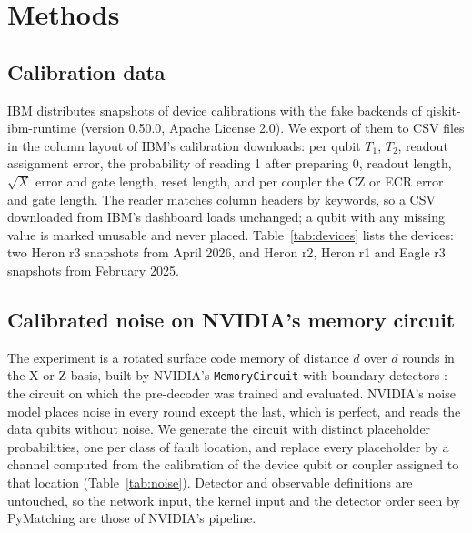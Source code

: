 \section{Methods}\label{sec:methods}

\subsection{Calibration data}\label{sec:calib}

IBM distributes snapshots of device calibrations with the fake backends of qiskit-ibm-runtime
\cite{qiskit_ibm_runtime} (version 0.50.0, Apache License 2.0). We export \NumDevices{} of them to CSV files in the
column layout of IBM's calibration downloads: per qubit $T_1$, $T_2$, readout assignment error, the probability of
reading 1 after preparing 0, readout length, $\sqrt{X}$ error and gate length, reset length, and per coupler the CZ
or ECR error and gate length. The reader matches column headers by keywords, so a CSV downloaded from IBM's dashboard
loads unchanged; a qubit with any missing value is marked unusable and never placed. Table~\ref{tab:devices} lists
the devices: two Heron r3 snapshots from April 2026, and Heron r2, Heron r1 and Eagle r3 snapshots from February 2025.

\begin{table}[t]
\caption{The eight calibration snapshots: medians over usable qubits and couplers.}\label{tab:devices}
\centering
\setlength{\tabcolsep}{4pt}

\end{table}

\subsection{Calibrated noise on NVIDIA's memory circuit}\label{sec:noise}

The experiment is a rotated surface code memory of distance $d$ over $d$ rounds in the X or Z basis, built by
NVIDIA's \texttt{MemoryCircuit} with boundary detectors \cite{nvidia_ising_code}: the circuit on which the pre-decoder
was trained and evaluated. NVIDIA's noise model places noise in every round except the last, which is perfect, and
reads the data qubits without noise. We generate the circuit with distinct placeholder probabilities, one per class
of fault location, and replace every placeholder by a channel computed from the calibration of the device qubit or
coupler assigned to that location (Table~\ref{tab:noise}). Detector and observable definitions are untouched, so the
network input, the kernel input and the detector order seen by PyMatching are those of NVIDIA's pipeline.

